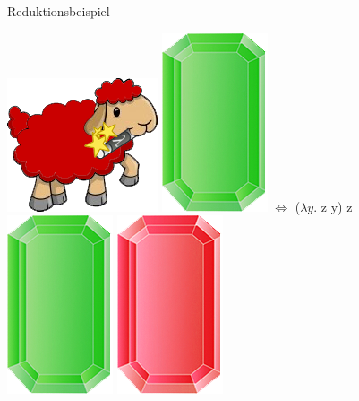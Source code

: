 \documentclass[18pt]{beamer}
\begin{document}
\begin{frame}{Reduktionsbeispiel}
	
	
	
\includegraphics[scale=1,7]{Pictures/lamb_red_wm}\thinspace \thinspace   
\includegraphics[scale=0.5]{Pictures/gem_green}
\thinspace \thinspace \thinspace \thinspace \thinspace \thinspace $\Leftrightarrow$ \thinspace \thinspace \thinspace \thinspace \thinspace \thinspace ($\lambda y. $ z y)  z
\\[0.3cm]
\includegraphics[scale=0.5]{Pictures/gem_green}
\includegraphics[scale=0.5]{Pictures/gem_red}
	
	
	
\end{frame}
\end{document}
